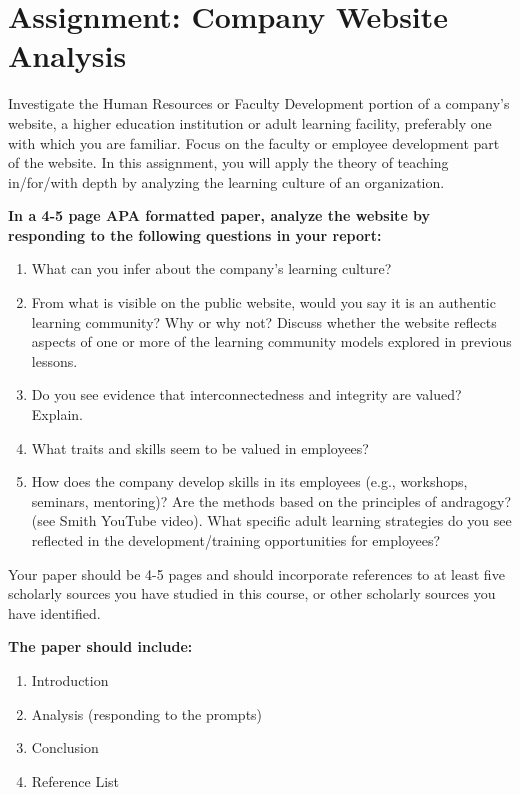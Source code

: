 \documentclass[
]{book}
\providecommand{\tightlist}{%
  \setlength{\itemsep}{0pt}\setlength{\parskip}{0pt}}
\begin{document}
\hypertarget{assignment-company-website-analysis}{%
\section*{Assignment: Company Website Analysis}\label{assignment-company-website-analysis}}

\begin{assessment}
Investigate the Human Resources or Faculty Development portion of a
company's website, a higher education institution or adult learning
facility, preferably one with which you are familiar. Focus on the
faculty or employee development part of the website. In this assignment,
you will apply the theory of teaching in/for/with depth by analyzing the
learning culture of an organization.

\textbf{In a 4-5 page APA formatted paper, analyze the website by
responding to the following questions in your report:}

\begin{enumerate}
\def\labelenumi{\arabic{enumi}.}
\tightlist
\item
  What can you infer about the company's learning culture?\\
\item
  From what is visible on the public website, would you say it is an
  authentic learning community? Why or why not? Discuss whether the
  website reflects aspects of one or more of the learning community
  models explored in previous lessons.\\
\item
  Do you see evidence that interconnectedness and integrity are valued?
  Explain.\\
\item
  What traits and skills seem to be valued in employees?\\
\item
  How does the company develop skills in its employees (e.g., workshops,
  seminars, mentoring)? Are the methods based on the principles of
  andragogy? (see Smith YouTube video). What specific adult learning
  strategies do you see reflected in the development/training
  opportunities for employees?
\end{enumerate}

Your paper should be 4-5 pages and should incorporate references to at
least five scholarly sources you have studied in this course, or other
scholarly sources you have identified.

\textbf{The paper should include:}

\begin{enumerate}
\def\labelenumi{\arabic{enumi}.}
\tightlist
\item
  Introduction\\
\item
  Analysis (responding to the prompts)\\
\item
  Conclusion\\
\item
  Reference List
\end{enumerate}
\end{assessment}
\end{document}
